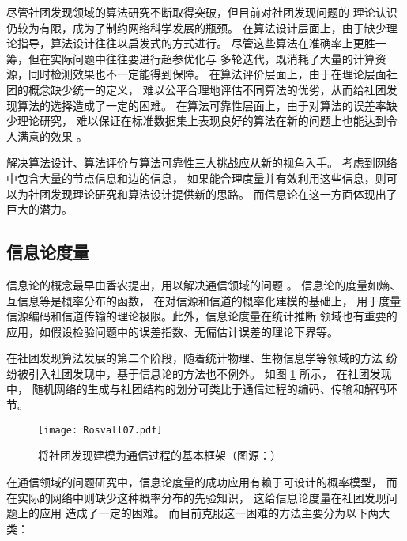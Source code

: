 
尽管社团发现领域的算法研究不断取得突破，但目前对社团发现问题的
理论认识仍较为有限，成为了制约网络科学发展的瓶颈。
在算法设计层面上，由于缺少理论指导，算法设计往往以启发式的方式进行。
尽管这些算法在准确率上更胜一筹，但在实际问题中往往要进行超参优化与
多轮迭代，既消耗了大量的计算资源，同时检测效果也不一定能得到保障。
在算法评价层面上，由于在理论层面社团的概念缺少统一的定义，
难以公平合理地评估不同算法的优劣，从而给社团发现算法的选择造成了一定的困难。
在算法可靠性层面上，由于对算法的误差率缺少理论研究，
难以保证在标准数据集上表现良好的算法在新的问题上也能达到令人满意的效果
\cite{xiangxiang2021info}。

解决算法设计、算法评价与算法可靠性三大挑战应从新的视角入手。
考虑到网络中包含大量的节点信息和边的信息，
如果能合理度量并有效利用这些信息，则可以为社团发现理论研究和算法设计提供新的思路。
而信息论在这一方面体现出了巨大的潜力。

\subsection{信息论度量}
信息论的概念最早由香农提出，用以解决通信领域的问题 \cite{shannon1948mathematical}。
信息论的度量如熵、互信息等是概率分布的函数，
在对信源和信道的概率化建模的基础上，
用于度量信源编码和信道传输的理论极限。此外，信息论度量在统计推断
领域也有重要的应用，如假设检验问题中的误差指数、无偏估计误差的理论下界等。

在社团发现算法发展的第二个阶段，随着统计物理、生物信息学等领域的方法
纷纷被引入社团发现中，基于信息论的方法也不例外。
如图 \ref{fig:communication_community} 所示，
在社团发现中，
随机网络的生成与社团结构的划分可类比于通信过程的编码、传输和解码环节。


\begin{figure}[!ht]
    \texttt{[image: Rosvall07.pdf]}
    \caption{将社团发现建模为通信过程的基本框架（图源：）}
    \label{fig:communication_community}
\end{figure}

在通信领域的问题研究中，信息论度量的成功应用有赖于可设计的概率模型，
而在实际的网络中则缺少这种概率分布的先验知识，
这给信息论度量在社团发现问题上的应用
造成了一定的困难。
而目前克服这一困难的方法主要分为以下两大类：

